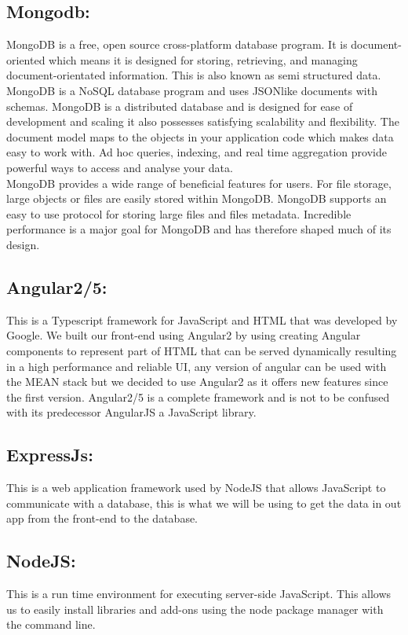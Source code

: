 \subsection{Mongodb:}
MongoDB is a free, open source cross-platform database program. It is
document-oriented which means it is designed for storing, retrieving, and
managing document-orientated information. This is also known as semi
structured data. MongoDB is a NoSQL database program and uses JSONlike
documents with schemas. MongoDB is a distributed database and is
designed for ease of development and scaling it also possesses satisfying scalability
and flexibility. The document model maps to the objects in your application
code which makes data easy to work with. Ad hoc queries, indexing,
and real time aggregation provide powerful ways to access and analyse your
data\cite{WhatIsMo75}.
\\
MongoDB provides a wide range of beneficial features for users. For file
storage, large objects or files are easily stored within MongoDB. MongoDB
supports an easy to use protocol for storing large files and files metadata. Incredible
performance is a major goal for MongoDB and has therefore shaped
much of its design\cite{usuarist10}.

\subsection{Angular2/5:}
This is a Typescript framework for JavaScript and HTML that was developed by Google. We built our front-end using Angular2 by using creating Angular components to represent part of HTML that can be served dynamically resulting in a high performance and reliable UI, any version of angular can be used with the MEAN stack but we decided to use Angular2 as it offers new features since the first version. Angular2/5 is a complete framework and is not to be confused with its predecessor AngularJS a JavaScript library.

\subsection{ExpressJs:}
This is a web application framework used by NodeJS that allows JavaScript to communicate with a database, this is what we will be using to get the data in out app from the front-end to the database.

\subsection{NodeJS:}
This is a run time environment for executing server-side JavaScript. This allows us to easily install libraries and add-ons using the node package manager with the command line.

